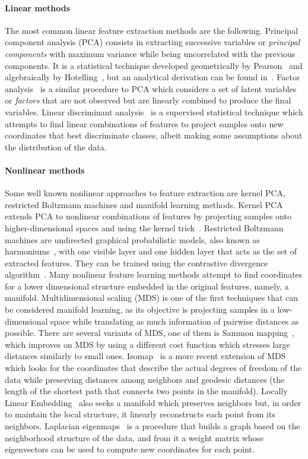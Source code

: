 \paragraph{Linear methods} The most common linear feature extraction methods are the following. Principal component analysis (PCA) consists in extracting successive variables or \textit{principal components} with maximum variance while being uncorrelated with the previous components. It is a statistical technique developed geometrically by Pearson~\cite{PCA} and algebraically by Hotelling~\cite{PCAHotelling}, but an analytical derivation can be found in~\cite{PCABook}. Factor analysis~\cite{PCAandFA} is a similar procedure to PCA which considers a set of latent variables or \textit{factors} that are not observed but are linearly combined to produce the final variables. Linear discriminant analysis~\cite{FisherLDA} is a supervised statistical technique which attempts to find linear combinations of features to project samples onto new coordinates that best discriminate classes, albeit making some assumptions about the distribution of the data. 

\paragraph{Nonlinear methods} Some well known nonlinear approaches to feature extraction are kernel PCA, restricted Boltzmann machines and manifold learning methods. Kernel PCA~\cite{KernelPCA} extends PCA to nonlinear combinations of features by projecting samples onto higher-dimensional spaces and using the kernel trick~\cite{kernelmethods}. Restricted Boltzmann machines are undirected graphical probabilistic models, also known as harmoniums~\cite{Harmonium}, with one visible layer and one hidden layer that acts as the set of extracted features. They can be trained using the contrastive divergence algorithm~\cite{ContrastiveDivergence}. Many nonlinear feature learning methods attempt to find coordinates for a lower dimensional structure embedded in the original features, namely, a manifold. Multidimensional scaling (MDS) is one of the first techniques that can be considered manifold learning, as its objective is projecting samples in a low-dimensional space while translating as much information of pairwise distances as possible. There are several variants of MDS, one of them is Sammon mapping~\cite{Sammon}, which improves on MDS by using a different cost function which stresses large distances similarly to small ones. Isomap~\cite{Isomap} is a more recent extension of MDS which looks for the coordinates that describe the actual degrees of freedom of the data while preserving distances among neighbors and geodesic distances (the length of the shortest path that connects two points in the manifold). Locally Linear Embedding~\cite{LLE} also seeks a manifold which preserves neighbors but, in order to maintain the local structure, it linearly reconstructs each point from its neighbors. Laplacian eigenmaps~\cite{LaplacianEigenmaps} is a procedure that builds a graph based on the neighborhood structure of the data, and from it a weight matrix whose eigenvectors can be used to compute new coordinates for each point.


